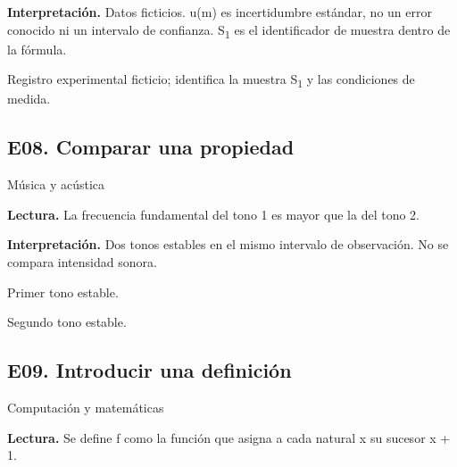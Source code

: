 \textbf{Interpretación.} Datos ficticios. u(m) es incertidumbre estándar, no un error conocido ni un intervalo de confianza. S\textsubscript{1} es el identificador de muestra dentro de la fórmula.

\begin{description}[font=\normalfont\bfseries,leftmargin=10mm]

\item[2] Registro experimental ficticio; identifica la muestra S\textsubscript{1} y las condiciones de medida.

\end{description}

\vspace{6mm}

\subsection{E08. Comparar una propiedad}

{\small\sffamily\color{KalaAcento}Música y acústica}


\textbf{Lectura.} La frecuencia fundamental del tono 1 es mayor que la del tono 2.

\textbf{Interpretación.} Dos tonos estables en el mismo intervalo de observación. No se compara intensidad sonora.

\begin{description}[font=\normalfont\bfseries,leftmargin=10mm]

\item[1] Primer tono estable.

\item[2] Segundo tono estable.

\end{description}

\clearpage

\subsection{E09. Introducir una definición}

{\small\sffamily\color{KalaAcento}Computación y matemáticas}


\textbf{Lectura.} Se define f como la función que asigna a cada natural x su sucesor x + 1.

